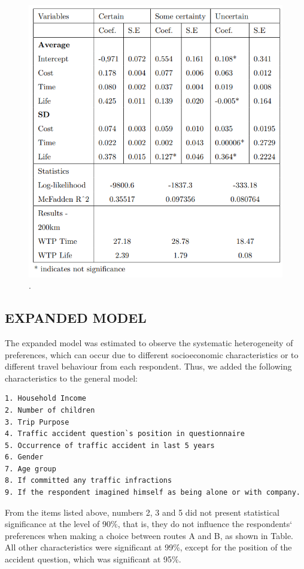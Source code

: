 \documentclass[]{elsarticle} %
\makeatletter
\def\maxwidth{\ifdim\Gin@nat@width>\linewidth\linewidth
\else\Gin@nat@width\fi}
\let\Oldincludegraphics\includegraphics
\renewcommand{\includegraphics}[1]{\Oldincludegraphics[width=\maxwidth]{#1}}
\makeatother
\begin{document}
\begin{figure}
\centering
\includegraphics{table17.png}
\caption{.}
\end{figure}

\hypertarget{expanded-model}{%
\subsection{EXPANDED MODEL}\label{expanded-model}}

The expanded model was estimated to observe the systematic heterogeneity
of preferences, which can occur due to different socioeconomic
characteristics or to different travel behaviour from each respondent.
Thus, we added the following characteristics to the general model:

\begin{verbatim}
1. Household Income
2. Number of children
3. Trip Purpose
4. Traffic accident question`s position in questionnaire
5. Occurrence of traffic accident in last 5 years
6. Gender
7. Age group
8. If committed any traffic infractions
9. If the respondent imagined himself as being alone or with company.
\end{verbatim}

From the items listed above, numbers 2, 3 and 5 did not present
statistical significance at the level of 90\%, that is, they do not
influence the respondents` preferences when making a choice between
routes A and B, as shown in Table. All other characteristics were
significant at 99\%, except for the position of the accident question,
which was significant at 95\%.
\end{document}
